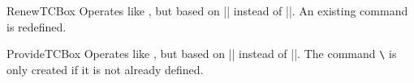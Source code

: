 \begin{docCommand}{RenewTCBox}{}
  Operates like , but based on |\RenewDocumentCommand| instead of |\DeclareDocumentCommand|.
  An existing command is redefined.
\end{docCommand}

\begin{docCommand}{ProvideTCBox}{}
  Operates like , but based on |\ProvideDocumentCommand| instead of |\DeclareDocumentCommand|.
  The command \texttt{\textbackslash} is only created if it is not already defined.
\end{docCommand}



\clearpage


